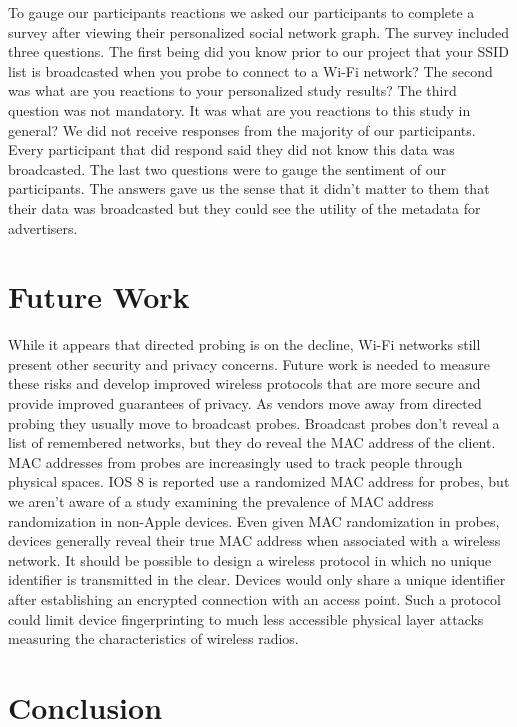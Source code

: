 \documentclass[letterpaper,twocolumn,10pt]{article}
\begin{document}
To gauge our participants reactions we asked our participants to complete a survey after viewing their personalized social network graph. The survey included three questions. The first being did you know prior to our project that your SSID list is broadcasted when you probe to connect to a Wi-Fi network? The second was what are you reactions to your personalized study results? The third question was not mandatory. It was what are you reactions to this study in general? We did not receive responses from the majority of our participants. Every participant that did respond said they did not know this data was broadcasted. The last two questions were to gauge the sentiment of our participants. The answers gave us the sense that it didn't matter to them that their data was broadcasted but they could see the utility of the metadata for advertisers.


\section{Future Work}
While it appears that directed probing is on the decline, Wi-Fi networks still present other security and privacy concerns. Future work is needed to measure these risks and develop improved wireless protocols that are more secure and provide improved guarantees of privacy. As vendors move away from directed probing they usually move to broadcast probes. Broadcast probes don't reveal a list of remembered networks, but they do reveal the MAC address of the client. MAC addresses from probes are increasingly used to track people through physical spaces. IOS 8 is reported use a randomized MAC address for probes, but we aren't aware of a study examining the prevalence of MAC address randomization in non-Apple devices. Even given MAC randomization in probes, devices generally reveal their true MAC address when associated with a wireless network. It should be possible to design a wireless protocol in which no unique identifier is transmitted in the clear. Devices would only share a unique identifier after establishing an encrypted connection with an access point. Such a protocol could limit device fingerprinting to much less accessible physical layer attacks measuring the characteristics of wireless radios.

\section{Conclusion}






\end{document}
